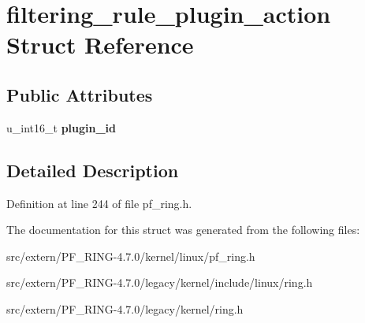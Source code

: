 \hypertarget{structfiltering__rule__plugin__action}{
\section{filtering\_\-rule\_\-plugin\_\-action Struct Reference}
\label{structfiltering__rule__plugin__action}
}
\subsection*{Public Attributes}
\begin{DoxyCompactItemize}
\item 
\hypertarget{structfiltering__rule__plugin__action_a73c8ddd11b492611fa9477202c458878}{
u\_\-int16\_\-t {\bfseries plugin\_\-id}}
\label{structfiltering__rule__plugin__action_a73c8ddd11b492611fa9477202c458878}

\end{DoxyCompactItemize}


\subsection{Detailed Description}


Definition at line 244 of file pf\_\-ring.h.



The documentation for this struct was generated from the following files:\begin{DoxyCompactItemize}
\item 
src/extern/PF\_\-RING-\/4.7.0/kernel/linux/pf\_\-ring.h\item 
src/extern/PF\_\-RING-\/4.7.0/legacy/kernel/include/linux/ring.h\item 
src/extern/PF\_\-RING-\/4.7.0/legacy/kernel/ring.h\end{DoxyCompactItemize}
